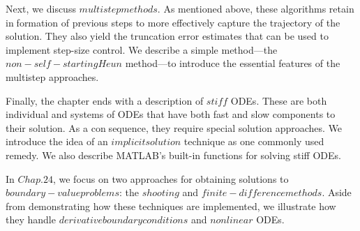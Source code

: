 Next, we discuss $multistep methods$. As mentioned above, these algorithms retain information of previous steps to more effectively capture the trajectory of the solution. They
also yield the truncation error estimates that can be used to implement step-size control. We
describe a simple method—the $non-self-starting Heun$ method—to introduce the essential
features of the multistep approaches.

Finally, the chapter ends with a description of $stiff$ ODEs. These are both individual
and systems of ODEs that have both fast and slow components to their solution. As a consequence, they require special solution approaches. We introduce the idea of an $implicit
solution$ technique as one commonly used remedy. We also describe MATLAB’s built-in
functions for solving stiff ODEs.

In $Chap. 24$, we focus on two approaches for obtaining solutions to $boundary-value
problems$: the $shooting$ and $finite-difference methods$. Aside from demonstrating how these
techniques are implemented, we illustrate how they handle $derivative boundary conditions$
and $nonlinear$ ODEs.















	
	
	
	


